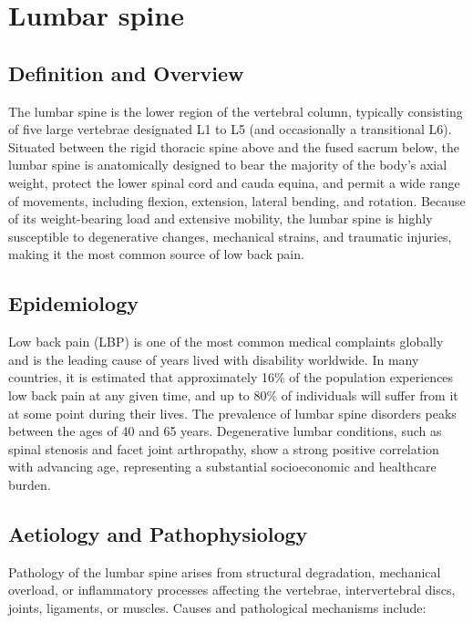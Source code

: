 \chapter{Lumbar spine}

\section*{Definition and Overview}
The lumbar spine is the lower region of the vertebral column, typically consisting of five large vertebrae designated L1 to L5 (and occasionally a transitional L6). Situated between the rigid thoracic spine above and the fused sacrum below, the lumbar spine is anatomically designed to bear the majority of the body's axial weight, protect the lower spinal cord and cauda equina, and permit a wide range of movements, including flexion, extension, lateral bending, and rotation. Because of its weight-bearing load and extensive mobility, the lumbar spine is highly susceptible to degenerative changes, mechanical strains, and traumatic injuries, making it the most common source of low back pain.

\section*{Epidemiology}
Low back pain (LBP) is one of the most common medical complaints globally and is the leading cause of years lived with disability worldwide. In many countries, it is estimated that approximately 16\% of the population experiences low back pain at any given time, and up to 80\% of individuals will suffer from it at some point during their lives. The prevalence of lumbar spine disorders peaks between the ages of 40 and 65 years. Degenerative lumbar conditions, such as spinal stenosis and facet joint arthropathy, show a strong positive correlation with advancing age, representing a substantial socioeconomic and healthcare burden.

\section*{Aetiology and Pathophysiology}
Pathology of the lumbar spine arises from structural degradation, mechanical overload, or inflammatory processes affecting the vertebrae, intervertebral discs, joints, ligaments, or muscles. Causes and pathological mechanisms include:

